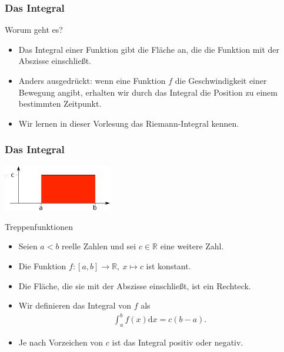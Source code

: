 \documentclass{beamer}
\title[Annuma]{\mytitle}
\author[Amin Coja-Oghlan]{Amin Coja-Oghlan}
\institute[Frankfurt]{JWGUFFM}
\date{}
\newcommand\dd{\mathrm d}
\newcommand\RR{\mathbb R}
\renewcommand{\ae}{\"a}
\newcommand{\ue}{\"u}
\newcommand{\mytitle}{Das Integral}
\begin{document}
\frame[plain]{\titlepage}

\begin{frame}\frametitle{\mytitle}
	\begin{block}{Worum geht es?}
		\begin{itemize}
			\item Das Integral einer Funktion gibt die Fl\ae che an, die die Funktion mit der Abszisse einschlie\ss t.
			\item Anders ausgedr\ue ckt: wenn eine Funktion $f$ die Geschwindigkeit einer Bewegung angibt, erhalten wir durch das Integral die Position zu einem bestimmten Zeitpunkt.
			\item Wir lernen in dieser Vorlesung das Riemann-Integral kennen.
		\end{itemize}
	\end{block}
\end{frame}

\begin{frame}\frametitle{\mytitle}
\hfill	\includegraphics[height=20mm]{pics/int1.pdf}
	\begin{block}{Treppenfunktionen}
		\begin{itemize}
			\item Seien $a<b$ reelle Zahlen und sei $c\in\RR$ eine weitere Zahl.
			\item Die Funktion $f:[a,b]\to\RR,\ x\mapsto c$
				ist konstant.
			\item Die Fl\ae che, die sie mit der Abszisse einschlie\ss t, ist ein Rechteck.
			\item Wir definieren das Integral von $f$ als
				\begin{align*}
					\int_a^bf(x)\dd x=c(b-a).
				\end{align*}
			\item Je nach Vorzeichen von $c$ ist das Integral positiv oder negativ.
		\end{itemize}
	\end{block}
\end{frame}
\end{document}

